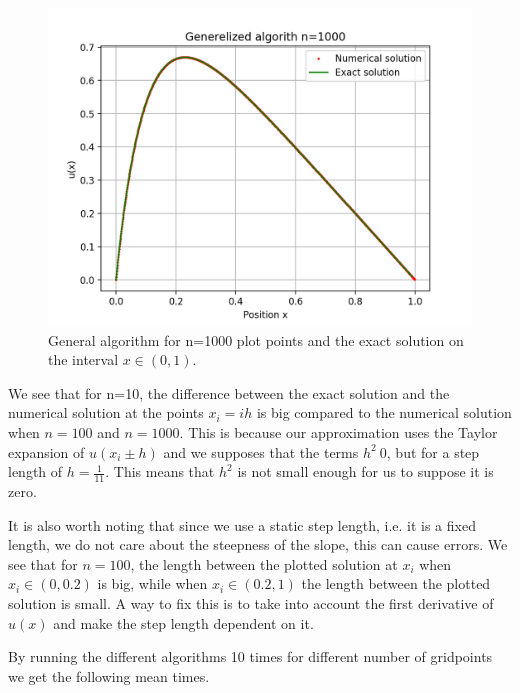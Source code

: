 \documentclass[10pt]{article}
\begin{document}
\begin{figure}[H]
  \center
  \includegraphics[scale=0.5]{alg-0-n1000plot.png}
  \caption{General algorithm for n=1000 plot points and the exact solution on the interval $x\in (0,1)$.}
  \label{fig:plotn1000}
\end{figure}

We see that for n=10, the difference between the exact solution and the numerical solution at the points $x_i=ih$ is big compared to the numerical solution when $n=100$ and $n=1000$. This is because our approximation uses the Taylor expansion of $u(x_i\pm h)$ and we supposes that the terms $h^2~0$, but for a step length of $h=\frac{1}{11}$. This means that $h^2$ is not small enough for us to suppose it is zero.

It is also worth noting that since we use a static step length, i.e. it is a fixed length, we do not care about the steepness of the slope, this can cause errors. We see that for $n=100$, the length between the plotted solution at $x_i$ when $x_i\in (0,0.2)$ is big, while when $x_i\in (0.2,1)$ the length between the plotted solution is small. A way to fix this is to take into account the first derivative of $u(x)$ and make the step length dependent on it.

By running the different algorithms 10 times for different number of gridpoints we get the following mean times.
\hfill\break

\end{document}
